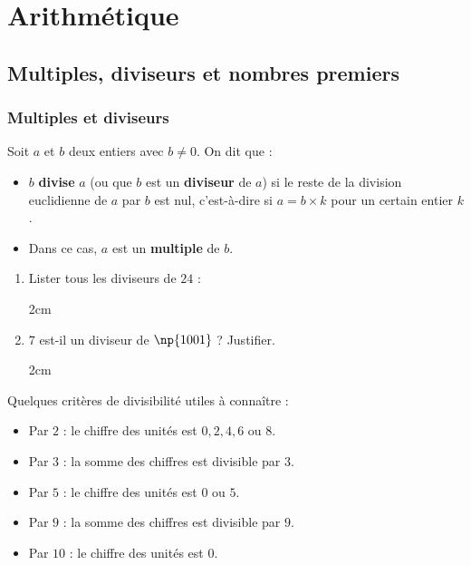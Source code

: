\documentclass[a4paper]{book}
\begin{document}
\setcounter{chapter}{3}
\renewcommand{\monTitre}{Arithmétique}
\chapter{\monTitre}
\thispagestyle{fancy}


\section{Multiples, diviseurs et nombres premiers}

\subsection{Multiples et diviseurs}

    \begin{definition}
        Soit $a$ et $b$ deux entiers avec $b \neq 0$. On dit que :
        \begin{itemize}
            \item $b$ \textbf{divise} $a$ (ou que $b$ est un \textbf{diviseur} de $a$) si le reste de la division euclidienne de $a$ par $b$ est nul, c'est-à-dire si $a = b \times k$ pour un certain entier $k$.
            \item Dans ce cas, $a$ est un \textbf{multiple} de $b$.
        \end{itemize}
    \end{definition}

    \begin{exemple}
        \begin{enumerate}
            \item Lister tous les diviseurs de $24$ :
            \begin{ZoneReponse}{2cm}
            \end{ZoneReponse}

            \item $7$ est-il un diviseur de $\np{1001}$ ? Justifier.
            \begin{ZoneReponse}{2cm}
            \end{ZoneReponse}
        \end{enumerate}
    \end{exemple}

    \begin{remarque}
        Quelques critères de divisibilité utiles à connaître :
        \begin{itemize}
            \item Par $2$ : le chiffre des unités est $0, 2, 4, 6$ ou $8$.
            \item Par $3$ : la somme des chiffres est divisible par $3$.
            \item Par $5$ : le chiffre des unités est $0$ ou $5$.
            \item Par $9$ : la somme des chiffres est divisible par $9$.
            \item Par $10$ : le chiffre des unités est $0$.
        \end{itemize}
    \end{remarque}
\end{document}
